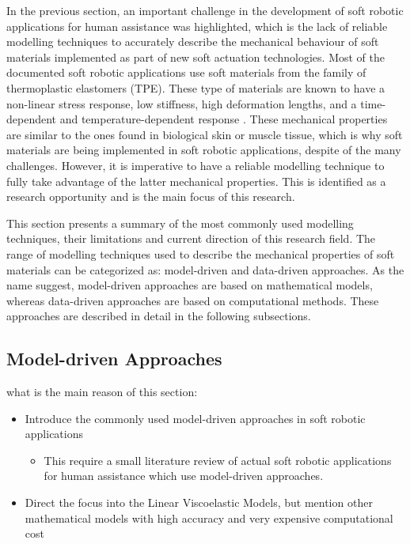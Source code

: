 In the previous section, an important challenge in the development of soft robotic applications for human assistance was highlighted, which is the lack of reliable modelling techniques to accurately describe the mechanical behaviour of soft materials implemented as part of new soft actuation technologies. Most of the documented soft robotic applications use soft materials from the family of thermoplastic elastomers (TPE). These type of materials are known to have a non-linear stress response, low stiffness, high deformation lengths, and a time-dependent and temperature-dependent response \cite{Bauman2008}. These mechanical properties are similar to the ones found in biological skin or muscle tissue, which is why soft materials are being implemented in soft robotic applications, despite of the many challenges. However, it is imperative to have a reliable modelling technique to fully take advantage of the latter mechanical properties. This is identified as a research opportunity and is the main focus of this research.

This section presents a summary of the most commonly used modelling techniques, their limitations and current direction of this research field. The range of modelling techniques used to describe the mechanical properties of soft materials can be categorized as: model-driven and data-driven approaches. As the name suggest, model-driven approaches are based on mathematical models, whereas data-driven approaches are based on computational methods. These approaches are described in detail in the following subsections.



\subsection{Model-driven Approaches}

what is the main reason of this section:
\begin{itemize}
    \item Introduce the commonly used model-driven approaches in soft robotic applications
    \begin{itemize}
        \item This require a small literature review of actual soft robotic applications for human assistance which use model-driven approaches.
    \end{itemize}
    \item Direct the focus into the Linear Viscoelastic Models, but mention other mathematical models with high accuracy and very expensive computational cost
\end{itemize}

